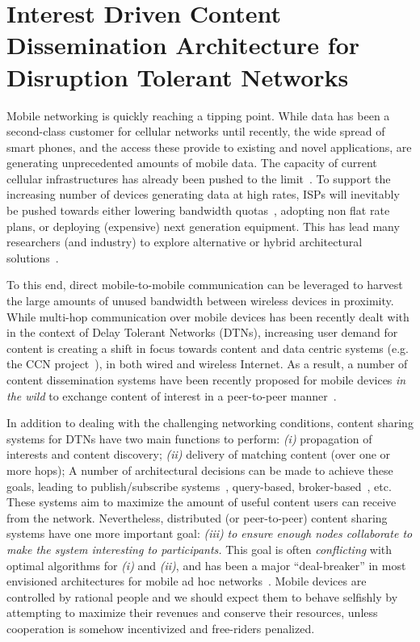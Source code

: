 \chapter{Interest Driven Content Dissemination Architecture for Disruption Tolerant Networks}
\label{chapter:PTMP}
\minitoc

Mobile networking is quickly reaching a tipping point. While data has been a second-class customer for cellular networks until recently, the wide spread of smart phones, and the access these provide to existing and novel applications, are generating unprecedented amounts of mobile data. The capacity of current cellular infrastructures has already been pushed to the limit~\cite{ATT}. To support the increasing number of devices generating data at high rates, ISPs will inevitably be pushed towards either lowering bandwidth quotas~\cite{ATT}, adopting non flat rate plans, or deploying (expensive) next generation equipment. This has lead many researchers (and industry) to explore alternative or hybrid architectural solutions~\cite{CellOffLoading}.

To this end, direct mobile-to-mobile communication can be leveraged to harvest the large amounts of unused bandwidth between wireless devices in proximity. While multi-hop communication over mobile devices has been recently dealt with in the context of Delay Tolerant Networks (DTNs), increasing user demand for content is creating a shift in focus towards content and data centric systems (e.g. the CCN project~\cite{CCN}), in both wired and wireless Internet. As a result, a number of content dissemination systems have been recently proposed for mobile devices \emph{in the wild} to exchange content of interest in a peer-to-peer manner~\cite{TACODTN, Peoplenet, podnet07, May07wirelessopportunistic, ContentPlace, OptimalChannelChoice, SocialCast, Boldrini:2008:MDD}.

In addition to dealing with the challenging networking conditions, content sharing systems for DTNs have two main functions to perform: \emph{(i)} propagation of interests and content discovery;  \emph{(ii)} delivery of matching content (over one or more hops);
A number of architectural decisions can be made to achieve these goals, leading to publish/subscribe systems~\cite{TACODTN, Peoplenet}, query-based, broker-based~\cite{podnet07, LOCUS, May07wirelessopportunistic, ContentPlace, OptimalChannelChoice, SocialCast, Boldrini:2008:MDD}, etc. These systems aim to maximize the amount of useful content users can receive from the network. Nevertheless, distributed (or peer-to-peer) content sharing systems have one more important goal: \emph{(iii)} \emph{to ensure enough nodes collaborate to make the system interesting to participants.} This goal is often \emph{conflicting} with optimal algorithms for \emph{(i)} and \emph{(ii)}, and has been a major ``deal-breaker'' in most envisioned architectures for mobile ad hoc networks~\cite{NashEquilibria}. Mobile devices are controlled by rational people and we should expect them to behave selfishly by attempting to maximize their revenues and conserve their resources, unless cooperation is somehow incentivized and free-riders penalized.

